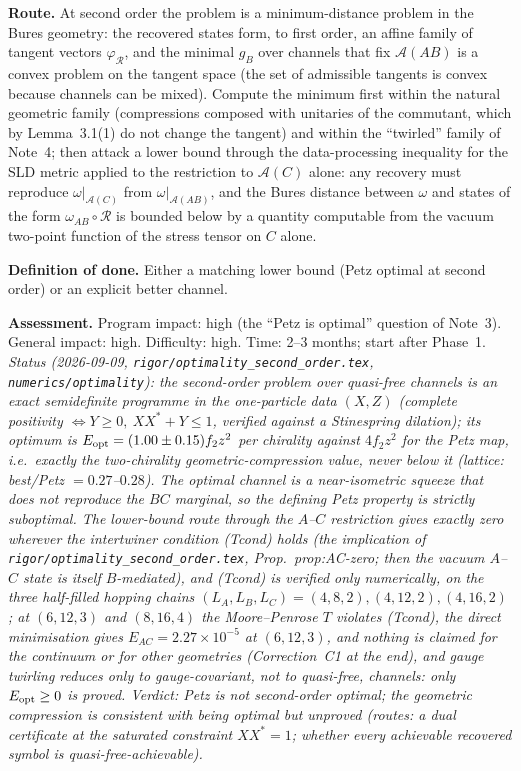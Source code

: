 \documentclass[11pt]{article}
\theoremstyle{accent}
\theoremstyle{definition}
\newcommand{\cA}{\mathcal{A}}
\newcommand{\cR}{\mathcal{R}}
\begin{document}
\textbf{Route.} At second order the problem is a minimum-distance problem in the Bures geometry: the recovered states form, to first order, an affine family of tangent vectors \(\varphi_{\cR}\), and the minimal \(g_B\) over channels that fix \(\cA(AB)\) is a convex problem on the tangent space (the set of admissible tangents is convex because channels can be mixed).  Compute the minimum first within the natural geometric family (compressions composed with unitaries of the commutant, which by Lemma~3.1(1) do not change the tangent) and within the ``twirled'' family of Note~4; then attack a lower bound through the data-processing inequality for the SLD metric applied to the restriction to \(\cA(C)\) alone: any recovery must reproduce \(\omega|_{\cA(C)}\) from \(\omega|_{\cA(AB)}\), and the Bures distance between \(\omega\) and states of the form \(\omega_{AB}\circ\cR\) is bounded below by a quantity computable from the vacuum two-point function of the stress tensor on \(C\) alone.

\textbf{Definition of done.} Either a matching lower bound (Petz optimal at second order) or an explicit better channel.

\textbf{Assessment.} Program impact: high (the ``Petz is optimal'' question of Note~3).  General impact: high.  Difficulty: high.  Time: 2--3 months; start after Phase~1.  \emph{Status (2026-09-09, \texttt{rigor/optimality\_second\_order.tex}, \texttt{numerics/optimality}): the second-order problem over quasi-free channels is an exact semidefinite programme in the one-particle data \((X,Z)\) (complete positivity \(\iff Y\ge0,\ XX^*+Y\le1\), verified against a Stinespring dilation); its optimum is \(E_{\rm opt}=(1.00\pm0.15)f_2z^2\) per chirality against \(4f_2z^2\) for the Petz map, i.e.\ exactly the two-chirality geometric-compression value, never below it (lattice: best/Petz \(=0.27\)--\(0.28\)).  The optimal channel is a near-isometric squeeze that does \emph{not} reproduce the \(BC\) marginal, so the defining Petz property is strictly suboptimal.  The lower-bound route through the \(A\)--\(C\) restriction gives exactly zero wherever the intertwiner condition (Tcond) holds (the implication of \texttt{rigor/optimality\_second\_order.tex}, Prop.~prop:AC-zero; then the vacuum \(A\)--\(C\) state is itself \(B\)-mediated), and (Tcond) is verified only numerically, on the three half-filled hopping chains \((L_A,L_B,L_C)=(4,8,2),(4,12,2),(4,16,2)\); at \((6,12,3)\) and \((8,16,4)\) the Moore--Penrose \(T\) violates (Tcond), the direct minimisation gives \(E_{AC}=2.27\times10^{-5}\) at \((6,12,3)\), and nothing is claimed for the continuum or for other geometries (Correction~C1 at the end), and gauge twirling reduces only to gauge-covariant, not to quasi-free, channels: only \(E_{\rm opt}\ge0\) is proved.  Verdict: Petz is not second-order optimal; the geometric compression is consistent with being optimal but unproved (routes: a dual certificate at the saturated constraint \(XX^*=1\); whether every achievable recovered symbol is quasi-free-achievable).}
\end{document}
